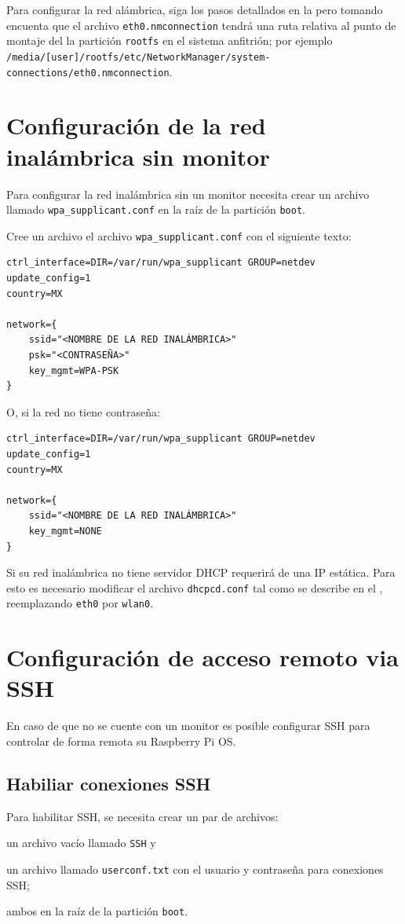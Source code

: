 \documentclass[letterpaper,10.5pt]{article}
\begin{document}
Para configurar la red alámbrica, siga los pasos detallados en la  pero tomando encuenta que el archivo \texttt{eth0.nmconnection} tendrá una ruta relativa al punto de montaje del la partición \texttt{rootfs} en el sistema anfitrión; por ejemplo
\texttt{/media/[user]/rootfs/etc/NetworkManager/system-connections/eth0.nmconnection}.


\section{Configuración de la red inalámbrica sin monitor}%
\label{sec:setup-wifi}
Para configurar la red inalámbrica sin un monitor necesita crear un archivo  llamado \texttt{wpa\_supplicant.conf} en la raíz de la partición \texttt{boot}.

Cree un archivo el archivo \texttt{wpa\_supplicant.conf} con el siguiente texto:

\begin{Verbatim}[fontsize=\footnotesize]
ctrl_interface=DIR=/var/run/wpa_supplicant GROUP=netdev
update_config=1
country=MX

network={
    ssid="<NOMBRE DE LA RED INALÁMBRICA>"
    psk="<CONTRASEÑA>"
    key_mgmt=WPA-PSK
}
\end{Verbatim}

O, si la red no tiene contraseña:

\begin{Verbatim}[fontsize=\footnotesize]
ctrl_interface=DIR=/var/run/wpa_supplicant GROUP=netdev
update_config=1
country=MX

network={
    ssid="<NOMBRE DE LA RED INALÁMBRICA>"
    key_mgmt=NONE
}
\end{Verbatim}

Si su red inalámbrica no tiene servidor DHCP requerirá de una IP estática.
Para esto es necesario modificar el archivo \texttt{dhcpcd.conf} tal como se describe en el , reemplazando \texttt{eth0} por \texttt{wlan0}.





\section{Configuración de acceso remoto via SSH}%
\label{sec:annex1}
En caso de que no se cuente con un monitor es posible configurar SSH para controlar de forma remota su Raspberry Pi OS. %

\subsection{Habiliar conexiones SSH}%
\label{sec:annex1-ssh-enable}
Para habilitar SSH, se necesita crear un par de archivos:
\begin{enumerate*}[label=\roman*\rpar]
	\item un archivo vacío llamado \texttt{SSH}
	y
	\item un archivo llamado \texttt{userconf.txt} con el usuario y contraseña para conexiones SSH; %
\end{enumerate*}
ambos en la raíz de la partición \texttt{boot}.
\end{document}
